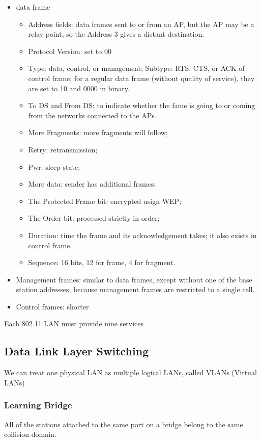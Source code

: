\begin{itemize}
    \item data frame
    \begin{itemize}
        \item Address fields: data frames sent to or from an AP, but the AP may be a relay point, so the Address 3 gives a distant destination.
        \item Protocol Version: set to 00
        \item Type: data, control, or management; Subtype: RTS, CTS, or ACK of control frame; for a regular data frame (without quality of service), they are set to 10 and 0000 in binary.
        \item To DS and From DS: to indicate whether the fame is going to or coming from the networks connected to the APs.
        \item More Fragments: more fragments will follow;
        \item Retry: retransmission;
        \item Pwr: sleep state;
        \item More data: sender has additional frames;
        \item The Protected Frame bit: encrypted usign WEP;
        \item The Order bit: processed strictly in order;
        \item Duration: time the frame and its acknowledgement takes; it also exists in control frame.
        \item Sequence: 16 bits, 12 for frame, 4 for fragment.
    \end{itemize}
    \item Management frames: similar to data frames, except without one of the base station addresses, because management frames are restricted to a single cell.
    \item Control frames: shorter
\end{itemize}

Each 802.11 LAN must provide nine services

\subsection{Data Link Layer Switching}
We can treat one physical LAN as multiple logical LANs, called
VLANs (Virtual LANs)

\subsubsection{Learning Bridge}%
All of the stations attached to the same port on a bridge belong to the same collision domain. 

